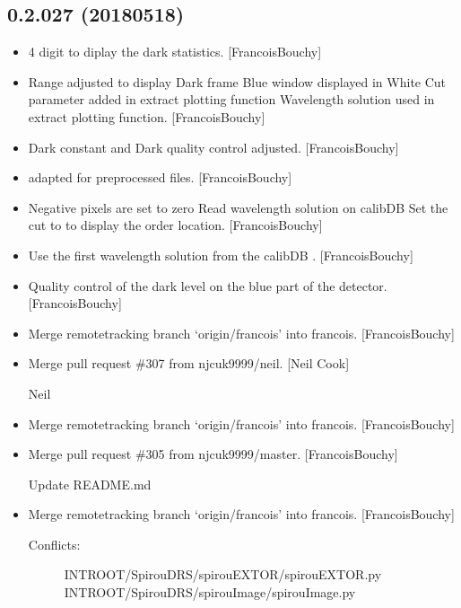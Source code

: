 \documentclass[a4paper,10pt,english]{report}
\begin{document}
\subsection{0.2.027 (2018\sphinxhyphen{}05\sphinxhyphen{}18)}
\label{\detokenize{misc/changelog:id454}}\begin{itemize}
\item {} 
4 digit to diplay the dark statistics. {[}FrancoisBouchy{]}

\item {} 
Range adjusted to display Dark frame Blue window displayed in White
Cut parameter added in extract plotting function Wavelength solution
used in extract plotting function. {[}FrancoisBouchy{]}

\item {} 
Dark constant and Dark quality control adjusted. {[}FrancoisBouchy{]}

\item {} 
 adapted for preprocessed files. {[}FrancoisBouchy{]}

\item {} 
Negative pixels are set to zero Read wavelength solution on calibDB
Set the cut to  to display the order location.
{[}FrancoisBouchy{]}

\item {} 
Use the first wavelength solution from the calibDB
. {[}FrancoisBouchy{]}

\item {} 
Quality control of the dark level on the blue part of the detector.
{[}FrancoisBouchy{]}

\item {} 
Merge remote\sphinxhyphen{}tracking branch ‘origin/francois’ into francois.
{[}FrancoisBouchy{]}

\item {} 
Merge pull request \#307 from njcuk9999/neil. {[}Neil Cook{]}

Neil

\item {} 
Merge remote\sphinxhyphen{}tracking branch ‘origin/francois’ into francois.
{[}FrancoisBouchy{]}

\item {} 
Merge pull request \#305 from njcuk9999/master. {[}FrancoisBouchy{]}

Update README.md

\item {} 
Merge remote\sphinxhyphen{}tracking branch ‘origin/francois’ into francois.
{[}FrancoisBouchy{]}
\begin{description}
\item[{Conflicts:}] \leavevmode
INTROOT/SpirouDRS/spirouEXTOR/spirouEXTOR.py
INTROOT/SpirouDRS/spirouImage/spirouImage.py

\end{description}

\end{itemize}
\end{document}
